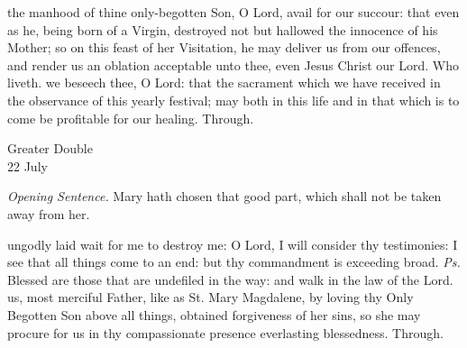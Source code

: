 \secret
{} the manhood of thine only-begotten Son, O Lord, avail for our succour: that even as he, being born of a Virgin, destroyed not but hallowed the innocence of his Mother; so on this feast of her Visitation, he may deliver us from our offences, and render us an oblation acceptable unto thee, even Jesus Christ our Lord. Who liveth.
\postcommunion
{} we beseech thee, O Lord: that the sacrament which we have received in the observance of this yearly festival; may both in this life and in that which is to come be profitable for our healing. Through.


\clearpage
\begin{inhead}
    {Greater Double\\
22 July}
\end{inhead}
\par\noindent
\textit{Opening Sentence.} Mary hath chosen that good part, which shall not be taken away from her.%

\introit
{} ungodly laid wait for me to destroy me: O Lord, I will consider thy testimonies: I see that all things come to an end: but thy commandment is exceeding broad. \textit{Ps.} Blessed are those that are undefiled in the way: and walk in the law of the Lord.
\collect
 us, most merciful Father, like as St. Mary Magdalene, by loving thy Only Begotten Son above all things, obtained forgiveness of her sins, so she may procure for us in thy compassionate presence everlasting blessedness. Through.

